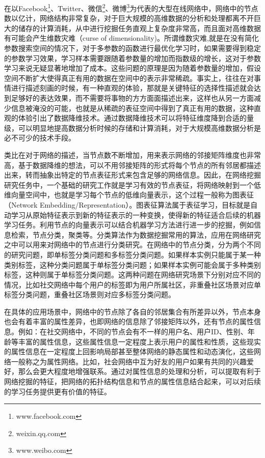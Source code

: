 在以Facebook\footnote{www.facebook.com}、Twitter、微信\footnote{weixin.qq.com}、微博\footnote{www.weibo.com}为代表的大型在线网络中，网络中的节点数以亿计，网络结构非常复杂，对于巨大规模的高维数据的分析和处理都离不开巨大的储存的计算消耗，从中进行挖掘任务直观上复杂度非常高，而且面对高维数据有可能会产生维数灾难\cite{bellman2015adaptive}（curse of dimensionality)。所谓维数灾难,就是在没有简化参数搜索空间的情况下，对于多参数的函数进行最优化学习时，如果需要得到稳定的参数学习效果，学习样本需要跟随着参数量的增加而指数级的增长，这对于参数学习来说无疑显著地增加了成本。这些问题的原理是因为随着参数量的增加，假设空间不断扩大使得真正有用的数据在空间中的表示非常稀疏。事实上，往往在对事情进行描述刻画的时候，有一种直观的体验，那就是关键特征的选择性描述就会达到足够好的表达效果，而不需要将事物的方方面面描述出来，这样也从另一方面减少信息被淹没的可能，也就是从稀疏的表征空间中得到了真正有用的数据，这种直观的体验引出了数据降维技术。通过数据降维技术可以将特征维度降到合适的量级，可以明显地提高数据分析时候的存储和计算消耗，对于大规模高维数据分析是必不可少的技术手段。

类比在对于网络的描述，当节点数不断增加，用来表示网络的邻接矩阵维度也非常高，基于数据降维的想法，可以不用邻接矩阵的形式将每个节点的所有邻居都描述出来，转而抽象出特定的节点表征形式来包含足够的网络信息。因此，在网络挖掘研究任务中，一个基础的研究工作就是学习有效的节点表征，将网络映射到一个低维向量空间中\cite{chang2015heterogeneous}，也就是学习每个节点的低维向量表示，这个过程一般称为图表征（Network Embedding/Representation）。图表征算法属于表征学习，目标就是自动学习从原始特征表示到新的特征表示的一种变换，使得新的特征适合后续的机器学习任务。利用节点的向量表示可以结合机器学习方法进行进一步的挖掘，例如信息检索\cite{weiss2009spectral}，节点分类\cite{krizhevsky2012imagenet}，聚类\cite{ng2002spectral}等。分类算法作为数据挖掘常用的算法，应用在网络研究之中可以用来对网络中的节点进行分类研究。在网络中的节点分类，分为两个不同的研究问题，即单标签分类问题和多标签分类问题。如果样本实例只能属于某一种类别标签，这种分类问题属于单标签分类问题；如果样本实例可能会属于多种类别标签，这种则属于单标签分类问题。这两种问题在网络研究场景下分别对应不同的情况，比如社交网络中每个用户的标签即为用户所属社区，非重叠社区场景对应单标签分类问题，重叠社区场景则对应多标签分类问题。

在具体的应用场景中，网络中的节点除了各自的邻居集合有所差异以外，节点本身也会有着丰富的属性差异，也即网络的信息除了邻接矩阵以外，还有节点的属性信息。例如：在社交网络中，不同的节点会有不一样的用户名、用户ID、性别、年龄等丰富的属性信息，这些属性信息一定程度上表示用户的属性和性质，这些现实的属性信息在一定程度上回影响局部甚至整体网络的静态属性和动态演化，这些网络一般称之为属性网络。比如，社会网络中互为好友的用户如果有共同的兴趣爱好，那么会更大程度地增强联系。通过对属性信息的处理和分析，可以提取有利于网络挖掘的特征，把网络的拓扑结构信息和节点的属性信息结合起来，可以对后续的学习任务提供更有价值的特征。

